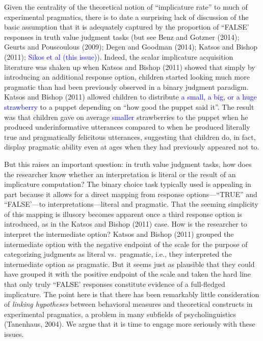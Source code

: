 \documentclass[man]{apa6}
\newcommand{\change}[1]{\textcolor{Blue}{#1}}
\theoremstyle{definition}
\theoremstyle{definition}
\theoremstyle{definition}
\theoremstyle{remark}
\begin{document}
Given the centrality of the theoretical notion of \enquote{implicature
rate} to much of experimental pragmatics, there is to date a surprising
lack of discussion of the basic assumption that it is adequately
captured by the proportion of ``FALSE' responses in truth value judgment
tasks (but see Benz and Gotzner (2014); Geurts and Pouscoulous (2009);
Degen and Goodman (2014); Katsos and Bishop (2011); \change{Sikos et al (this issue)}). Indeed, the scalar
implicature acquisition literature was shaken up when Katsos and Bishop
(2011) showed that simply by introducing an additional response option,
children started looking much more pragmatic than had been previously
observed in a binary judgment paradigm. Katsos and Bishop (2011) allowed
children to distribute \change{a small, a big, or a huge strawberry } to a puppet depending on
\enquote{how good the puppet said it}. The result was that children gave
on average \change{smaller} strawberries to the puppet when he produced
underinformative utterances compared to when he produced literally true
and pragmatically felicitous utterances, suggesting that children do, in
fact, display pragmatic ability even at ages when they had previously
appeared not to.

But this raises an important question: in truth value judgment tasks,
how does the researcher know whether an interpretation is literal or the
result of an implicature computation? The binary choice task typically
used is appealing in part because it allows for a direct mapping from
response options---``TRUE'' and ``FALSE'---to interpretations---literal and
pragmatic. That the seeming simplicity of this mapping is illusory
becomes apparent once a third response option is introduced, as in the
Katsos and Bishop (2011) case. How is the researcher to interpret the
intermediate option? Katsos and Bishop (2011) grouped the intermediate
option with the negative endpoint of the scale for the purpose of
categorizing judgments as literal vs.~pragmatic, i.e., they interpreted
the intermediate option as pragmatic. But it seems just as plausible
that they could have grouped it with the positive endpoint of the scale
and taken the hard line that only truly ``FALSE' responses constitute
evidence of a full-fledged implicature. The point here is that there has
been remarkably little consideration of \emph{linking hypotheses}
between behavioral measures and theoretical constructs in experimental
pragmatics, a problem in many subfields of psycholinguistics (Tanenhaus,
2004). We argue that it is time to engage more seriously with these
issues.
\end{document}
